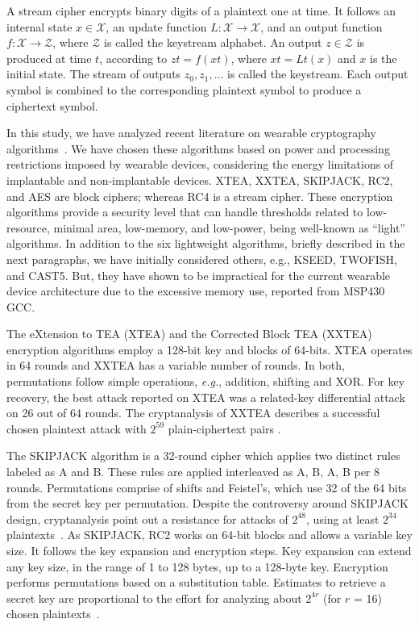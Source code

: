 \documentclass[journal]{IEEEtran}
\begin{document}
 A stream cipher encrypts binary digits of a plaintext one at time. It follows an internal state $x \in \mathcal{X}$, an update function $L: \mathcal{X} \rightarrow \mathcal{X}$, and an output function $f: \mathcal{X} \rightarrow \mathcal{Z}$, where $\mathcal{Z}$ is called the keystream alphabet. An output $z \in \mathcal{Z}$ is produced at time $t$, according to $zt = f(xt)$, where $xt = Lt(x)$ and $x$ is the initial state. The stream of outputs $z_0, z_1, \ldots$ is called the keystream. Each output symbol is combined to the corresponding plaintext symbol to produce a ciphertext symbol.

 In this study, we have analyzed recent literature on wearable cryptography algorithms~\cite{cazorla2013survey, sallam2018survey, dener2018comparison}. We have chosen these algorithms based on power and processing restrictions imposed by wearable devices, considering the energy limitations of implantable and non-implantable devices. XTEA, XXTEA, SKIPJACK, RC2, and AES are block ciphers; whereas RC4 is a stream cipher. These encryption algorithms provide a security level that can handle thresholds related to low-resource, minimal area, low-memory, and low-power, being well-known as “light” algorithms. In addition to the six lightweight algorithms, briefly described in the next paragraphs, we have initially considered others, e.g., KSEED, TWOFISH, and CAST5. But, they have shown to be impractical for the current wearable device architecture due to the excessive memory use, reported from MSP430 GCC. 

The eXtension to TEA (XTEA) and the Corrected Block TEA (XXTEA) encryption algorithms employ a 128-bit key and blocks of 64-bits. XTEA operates in 64 rounds and XXTEA has a variable number of rounds. In both, permutations follow simple operations, {\em e.g.}, addition, shifting and XOR. For key recovery, the best attack reported on XTEA was a related-key differential attack on 26 out of 64 rounds. The cryptanalysis of XXTEA describes a successful chosen plaintext attack with $2^{59}$ plain-ciphertext pairs \cite{sallam2018survey}.

The SKIPJACK algorithm is a 32-round cipher which applies two distinct rules labeled as A and B. These rules are applied interleaved as A, B, A, B per 8 rounds. Permutations comprise of shifts and Feistel's, which use 32 of the 64 bits from the secret key per permutation. Despite the controversy around SKIPJACK design, cryptanalysis point out a resistance for attacks of $2^{48}$, using at least $2^{34}$ plaintexts~\cite{biham2005cryptanalysis}. As SKIPJACK, RC2 works on 64-bit blocks and allows a variable key size. It follows the key expansion and encryption steps. Key expansion can extend any key size, in the range of 1 to 128 bytes, up to a 128-byte key. Encryption performs permutations based on a substitution table. Estimates to retrieve a secret key are proportional to the effort for analyzing about $2^{4r}$ (for $r$ = 16) chosen plaintexts~\cite{knudsen1998design}.
\end{document}
